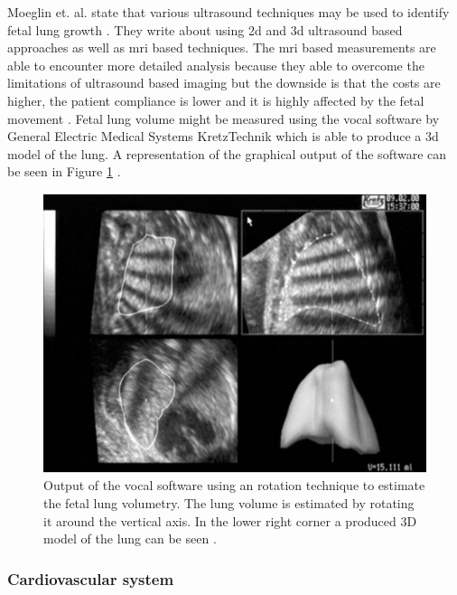 Moeglin et. al. state that various ultrasound techniques may be used to identify fetal lung growth \cite{Moeglin2005}. They write about using \gls{2d} and \gls{3d} ultrasound based approaches as well as \gls{mri} based techniques. The \gls{mri} based measurements are able to encounter more detailed analysis because they able to overcome the limitations of ultrasound based imaging but the downside is that the costs are higher, the patient compliance is lower and it is highly affected by the fetal movement \cite{Moeglin2005,Bonet-Carne2015QuantitativeMorbidity}.\newline\newline
Fetal lung volume might be measured using the \gls{vocal} software by General Electric Medical Systems KretzTechnik which is able to produce a \gls{3d} model of the lung. A representation of the graphical output of the software can be seen in Figure \ref{fig:fetal_lung_volumetry} \cite{Moeglin2005}.\newline

\begin{figure} [htb!]
    \centering
	\includegraphics[width=12cm]{content/images/fetal_lung_volumetry}
	\caption{Output of the \gls{vocal} software using an rotation technique to estimate the fetal lung volumetry. The lung volume is estimated by rotating it around the vertical axis. In the lower right corner a produced 3D model of the lung can be seen \cite{Moeglin2005}.}
	\label{fig:fetal_lung_volumetry}
\end{figure}
\newpage
\subsubsection{Cardiovascular system}

